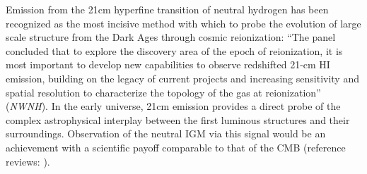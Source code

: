 \documentclass[preprint]{aastex}
\def\nwnh{{\sl NWNH}}
\begin{document}
Emission from the 21cm hyperfine transition of neutral hydrogen has
been recognized as the most incisive method with which to probe the
evolution of large scale structure from the Dark Ages through cosmic
reionization: ``The panel concluded that to explore the discovery area
of the epoch of reionization, it is most important to develop new
capabilities to observe redshifted 21-cm HI emission, building on the
legacy of current projects and increasing sensitivity and spatial
resolution to characterize the topology of the gas at reionization''
(\nwnh).  In the early universe, 21cm emission provides a
direct probe of the complex astrophysical interplay between the first
luminous structures and their surroundings.  Observation of
the neutral IGM via this signal would be an achievement with a
scientific payoff comparable to that of the CMB (reference reviews:
\citealt{furlanetto_et_al2006,pritchard_review,fan_et_al2006,morales_wyithe2010}).

\end{document}
